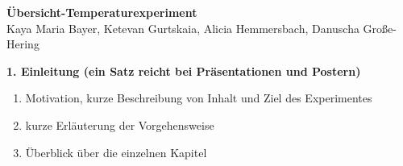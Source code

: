 \documentclass[ ngerman, fontsize= 12pt, paper=a4, headings=big, titlepage=true]{article}
\begin{document}
\textbf{}	

\begin{center}
	
\textbf{\Large{Übersicht-Temperaturexperiment}} \\

Kaya Maria Bayer, Ketevan Gurtskaia, Alicia Hemmersbach, Danuscha Große-Hering

\end{center}

\textbf{1. Einleitung (ein Satz reicht bei Präsentationen und Postern)}
\begin{enumerate}[-]
\item Motivation, kurze Beschreibung von Inhalt und Ziel des Experimentes
\item kurze Erläuterung der Vorgehensweise
\item Überblick über die einzelnen Kapitel
\end{enumerate}
\end{document}
